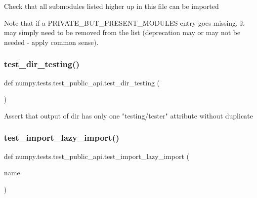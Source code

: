 \begin{DoxyVerb}Check that all submodules listed higher up in this file can be imported

Note that if a PRIVATE_BUT_PRESENT_MODULES entry goes missing, it may
simply need to be removed from the list (deprecation may or may not be
needed - apply common sense).
\end{DoxyVerb}
 \mbox{\label{namespacenumpy_1_1tests_1_1test__public__api_a9349a6766aea5243fb6573d8d23448fe}} 
\subsubsection{\texorpdfstring{test\+\_\+dir\+\_\+testing()}{test\_dir\_testing()}}
{\footnotesize\ttfamily def numpy.\+tests.\+test\+\_\+public\+\_\+api.\+test\+\_\+dir\+\_\+testing (\begin{DoxyParamCaption}{ }\end{DoxyParamCaption})}

\begin{DoxyVerb}Assert that output of dir has only one "testing/tester"
attribute without duplicate\end{DoxyVerb}
 \mbox{\label{namespacenumpy_1_1tests_1_1test__public__api_ac2773cb5b34729d04d3c73738c1664c3}} 
\subsubsection{\texorpdfstring{test\+\_\+import\+\_\+lazy\+\_\+import()}{test\_import\_lazy\_import()}}
{\footnotesize\ttfamily def numpy.\+tests.\+test\+\_\+public\+\_\+api.\+test\+\_\+import\+\_\+lazy\+\_\+import (\begin{DoxyParamCaption}\item[{}]{name }\end{DoxyParamCaption})}


